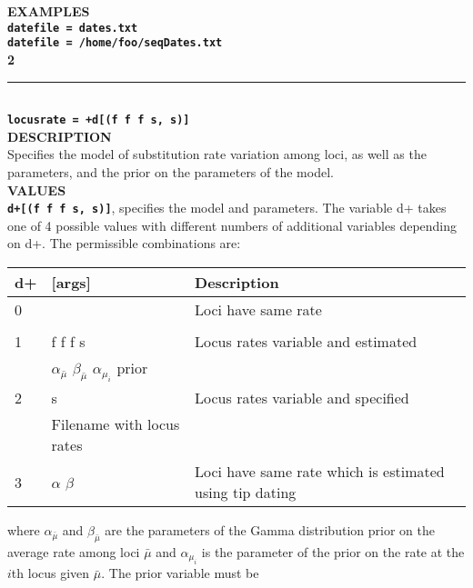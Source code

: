 \documentclass[11pt]{article}
\begin{document}
\textbf{EXAMPLES} \vspace{5pt}\\
\textbf{\texttt{datefile = dates.txt}}\vspace{5pt}\\
\textbf{\texttt{datefile = /home/foo/seqDates.txt}}\vspace{10pt}\\
\noindent\textbf{{\large 2}} \\
\noindent\rule{\textwidth}{0.8pt} \\
\textbf{{\Large \texttt{locusrate = +d[(f f f s, s)]}}} \vspace{5pt}\\
\textbf{DESCRIPTION} \vspace{5pt}\\
Specifies the model of substitution rate variation among loci, as well
as the parameters, and the prior on the parameters of the model.
\vspace{5pt}\\
\textbf{VALUES} \vspace{5pt}\\
\textbf{\texttt{d+[(f f f s, s)]}}, specifies the model and
parameters. The variable d+ takes one of 4 possible values with
different numbers of additional variables depending on d+. The
permissible combinations are:
\begin{table}[H]
	\begin{tabular}{@{}lll@{}}
		\toprule
		\textbf{d+} & \textbf{{[}args{]}}  & \textbf{Description} \\ \midrule
		0 &  & Loci have same rate \\
		&  &  \\
		1 & f f f s & Locus rates variable and estimated \\
		& $\alpha_{\bar{\mu}} \,\, \beta_{\bar{\mu}} \,\, \alpha_{\mu_i}$ prior & \\
		2 & s & Locus rates variable and specified \\ 
		& Filename with locus rates & \\
		3 & $\alpha$ $\beta$ &  Loci have same rate which is estimated using tip dating\\ \bottomrule
	\end{tabular}
\end{table}
\noindent
where $\alpha_{\bar{\mu}}$ and $\beta_{\bar{\mu}}$ are the parameters
of the Gamma distribution prior on the average rate among loci
$\bar{\mu}$ and $\alpha_{\mu_i}$ is the parameter of the prior on the
rate at the $i$th locus given $\bar{\mu}$. The prior variable must be
\end{document}
